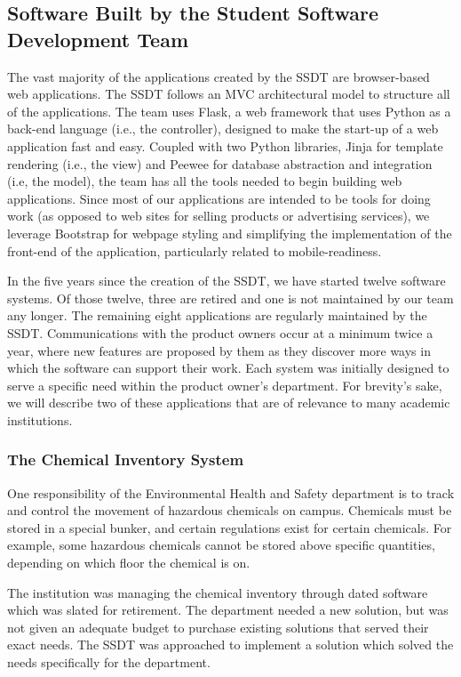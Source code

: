 
\subsection{Software Built by the Student Software Development Team}
The vast majority of the applications created by the SSDT are browser-based web applications. The SSDT follows an MVC architectural model to structure all of the applications. The team uses Flask, a web framework that uses Python as a back-end language (i.e., the controller), designed to make the start-up of a web application fast and easy. Coupled with two Python libraries, Jinja for template rendering (i.e., the view) and Peewee for database abstraction and integration (i.e, the model), the team has all the tools needed to begin building web applications. Since most of our applications are intended to be tools for doing work (as opposed to web sites for selling products or advertising services), we leverage Bootstrap for webpage styling and simplifying the implementation of the front-end of the application, particularly related to mobile-readiness. 

In the five years since the creation of the SSDT, we have started twelve software systems. Of those twelve, three are retired and one is not maintained by our team any longer. The remaining eight applications are regularly maintained by the SSDT. Communications with the product owners occur at a minimum twice a year, where new features are proposed by them as they discover more ways in which the software can support their work. Each system was initially designed to serve a specific need within the product owner's department. For brevity's sake, we will describe two of these applications that are of relevance to many academic institutions.

\subsubsection{The Chemical Inventory System}
One responsibility of the Environmental Health and Safety department is to track and control the movement of hazardous chemicals on campus. Chemicals must be stored in a special bunker, and certain regulations exist for certain chemicals. For example, some hazardous chemicals cannot be stored above specific quantities, depending on which floor the chemical is on. 

The institution was managing the chemical inventory through dated software which was slated for retirement. The department needed a new solution, but was not given an adequate budget to purchase existing solutions that served their exact needs. The SSDT was approached to implement a solution which solved the needs specifically for the department. 

